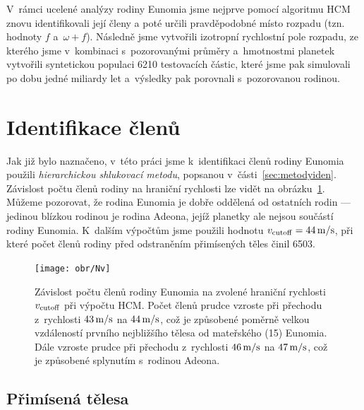 \documentclass[A4paper, 12pt, oneside]{book}
\begin{document}
V~rámci ucelené analýzy rodiny Eunomia jsme nejprve pomocí algoritmu HCM znovu identifikovali její členy a poté určili pravděpodobné místo rozpadu (tzn. hodnoty $f$ a~$\omega + f$). Následně jsme vytvořili izotropní rychlostní pole rozpadu, ze kterého jsme v~kombinaci s~pozorovanými průměry a~hmotnostmi planetek vytvořili syntetickou populaci 6210 testovacích částic, které jsme pak simulovali po dobu jedné miliardy let a~výsledky pak porovnali s~pozorovanou rodinou.

\section{Identifikace členů}

Jak již bylo naznačeno, v~této práci jsme k~identifikaci členů rodiny Eunomia použili \textit{hierarchickou shlukovací metodu}, popsanou v~části~\ref{sec:metodyiden}. Závislost počtu členů rodiny na hraniční rychlosti lze vidět na obrázku~\ref{fig:Nv}. Můžeme pozorovat, že rodina Eunomia je dobře oddělená od ostatních rodin --- jedinou blízkou rodinou je rodina Adeona, jejíž planetky ale nejsou součástí rodiny Eunomia. K~dalším výpočtům jsme použili hodnotu $v_{\rm cutoff}=44\,{\rm m/s}$, při které počet členů rodiny před odstraněním přimísených těles činil 6503.

\begin{figure}
	\centering
	\texttt{[image: obr/Nv]}
	\caption{Závislost počtu členů rodiny Eunomia na zvolené hraniční rychlosti $v_{\rm cutoff}$ při výpočtu HCM\@. Počet členů prudce vzroste při přechodu z~rychlosti $43\,{\rm m/s}$ na $44\,{\rm m/s}$, což je způsobené poměrně velkou vzdáleností prvního nejbližšího tělesa od mateřského (15) Eunomia. Dále vzroste prudce při přechodu z~rychlosti $46\,{\rm m/s}$ na $47\,{\rm m/s}$, což je způsobené splynutím s~rodinou Adeona.}
	\label{fig:Nv}
\end{figure}

\subsection{Přimísená tělesa} \label{sec:interlopers}
\end{document}
